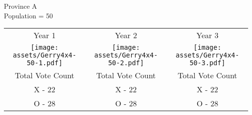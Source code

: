 Province A \\
Population = 50
\begin{tabular}{c c c }

Year 1 & Year 2 & Year 3 \\
 \texttt{[image: assets/Gerry4x4-50-1.pdf]} &  \texttt{[image: assets/Gerry4x4-50-2.pdf]} &  \texttt{[image: assets/Gerry4x4-50-3.pdf]}\\
 Total Vote Count &  Total Vote Count &  Total Vote Count\\
 X - 22 & X - 22 & X  - 22\\
 O - 28 & O - 28 & O - 28
\end{tabular}